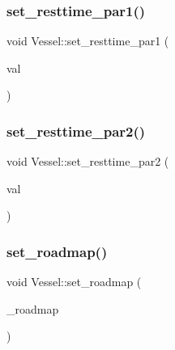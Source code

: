 \mbox{\label{class_vessel_a5a007b0726eff322fa284a69f840ecbf}} 
\subsubsection{\texorpdfstring{set\_resttime\_par1()}{set\_resttime\_par1()}}
{\footnotesize\ttfamily void Vessel\+::set\+\_\+resttime\+\_\+par1 (\begin{DoxyParamCaption}\item[{double}]{val }\end{DoxyParamCaption})}

\mbox{\label{class_vessel_a0bd3eb7841a73e3e80c1afc4865dabdf}} 
\subsubsection{\texorpdfstring{set\_resttime\_par2()}{set\_resttime\_par2()}}
{\footnotesize\ttfamily void Vessel\+::set\+\_\+resttime\+\_\+par2 (\begin{DoxyParamCaption}\item[{double}]{val }\end{DoxyParamCaption})}

\mbox{\label{class_vessel_aa3e9f5f72c4f36a9f3bee7ce96941e72}} 
\subsubsection{\texorpdfstring{set\_roadmap()}{set\_roadmap()}}
{\footnotesize\ttfamily void Vessel\+::set\+\_\+roadmap (\begin{DoxyParamCaption}\item[{const std\+::list$<$ \mbox{\hyperlink{classtypes_1_1_node_id}{types\+::\+Node\+Id}} $>$ \&}]{\+\_\+roadmap }\end{DoxyParamCaption})}

\mbox{\label{class_vessel_ab6112ebec0f3b3941b31873639dee2ec}} 
